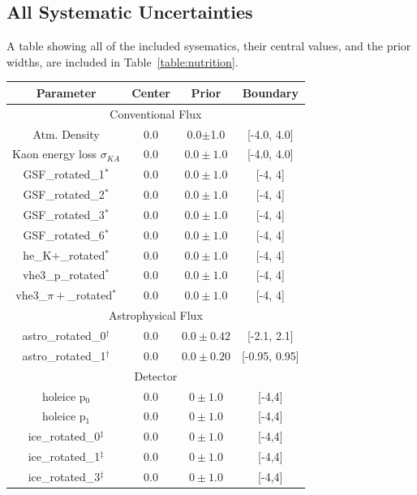 \documentclass[main.tex]{subfiles}
\begin{document}
\subsection{All Systematic Uncertainties}

A table showing all of the included sysematics, their central values, and the prior widths, are included in Table~\ref{table:nutrition}.

\begin{table}
    \centering
    \begin{tabular}{c | ccc}\rowcolor{blue!25}
        {\large Parameter} & {\large Center} & {\large Prior} & {\large Boundary} \\\hline
        \multicolumn{4}{c}{Conventional Flux} \\\hline
        Atm. Density & 0.0 & 0.0$\pm$1.0 & [-4.0, 4.0] \\
        Kaon energy loss $\sigma_{KA}$ & 0.0 & $0.0\pm1.0$ & [-4.0, 4.0]\\
        GSF\_rotated\_1$^{*}$  & 0.0 & $0.0\pm1.0$ & [-4, 4]\\
        GSF\_rotated\_2$^{*}$  & 0.0 & $0.0\pm1.0$ & [-4, 4]\\
        GSF\_rotated\_3$^{*}$  & 0.0 & $0.0\pm1.0$ & [-4, 4]\\
        GSF\_rotated\_6$^{*}$  & 0.0 & $0.0\pm1.0$ & [-4, 4]\\
        he\_K$+$\_rotated$^{*}$ & 0.0 & $0.0\pm1.0$ & [-4, 4]\\
        vhe3\_p\_rotated$^{*}$ & 0.0 & $0.0\pm1.0$ & [-4, 4]\\
        vhe3\_$\pi+$\_rotated$^{*}$ & 0.0 & $0.0\pm1.0$ & [-4, 4]\\
        \multicolumn{4}{c}{Astrophysical Flux} \\\hline
        astro\_rotated\_0$^{\dag}$ & 0.0 & $0.0\pm 0.42 $ & [-2.1, 2.1]\\
        astro\_rotated\_1$^{\dag}$ & 0.0 & $0.0\pm0.20$ & [-0.95, 0.95]\\
        \multicolumn{4}{c}{Detector} \\\hline
        holeice p$_{0}$ & 0.0 & $0\pm 1.0$ & [-4,4]\\
        holeice p$_{1}$ & 0.0 & $0\pm 1.0$ & [-4,4]\\
        ice\_rotated\_0$^{\ddag}$ & 0.0 & $0\pm 1.0$ & [-4,4]\\
        ice\_rotated\_1$^{\ddag}$ & 0.0 & $0\pm 1.0$ & [-4,4]\\
        ice\_rotated\_3$^{\ddag}$ & 0.0 & $0\pm 1.0$ & [-4,4]\\

\end{tabular}
\end{table}
\end{document}
